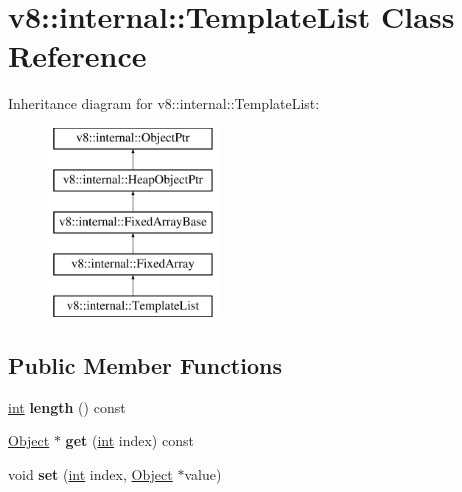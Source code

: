 \hypertarget{classv8_1_1internal_1_1TemplateList}{}\section{v8\+:\+:internal\+:\+:Template\+List Class Reference}
\label{classv8_1_1internal_1_1TemplateList}
Inheritance diagram for v8\+:\+:internal\+:\+:Template\+List\+:\begin{figure}[H]
\begin{center}
\leavevmode
\includegraphics[height=5.000000cm]{classv8_1_1internal_1_1TemplateList}
\end{center}
\end{figure}
\subsection*{Public Member Functions}
\begin{DoxyCompactItemize}
\item 
\mbox{\label{classv8_1_1internal_1_1TemplateList_adfd1e7a8940f6ad6fe3fad634ef8589b}} 
\mbox{\hyperlink{classint}{int}} {\bfseries length} () const
\item 
\mbox{\label{classv8_1_1internal_1_1TemplateList_ad89c9e30c5da690e2d1290298eeebb72}} 
\mbox{\hyperlink{classv8_1_1internal_1_1Object}{Object}} $\ast$ {\bfseries get} (\mbox{\hyperlink{classint}{int}} index) const
\item 
\mbox{\label{classv8_1_1internal_1_1TemplateList_a13933b66052ca96c07361104b119ba61}} 
void {\bfseries set} (\mbox{\hyperlink{classint}{int}} index, \mbox{\hyperlink{classv8_1_1internal_1_1Object}{Object}} $\ast$value)
\end{DoxyCompactItemize}
